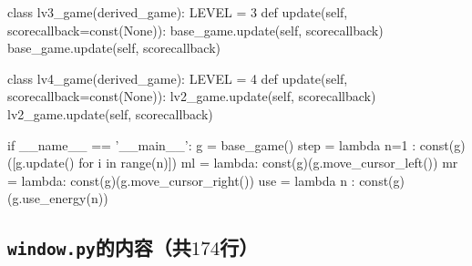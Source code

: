 \documentclass[UTF8]{article}
\begin{document}
\begin{python}
class lv3_game(derived_game):
    LEVEL = 3
    def update(self, scorecallback=const(None)):
        base_game.update(self, scorecallback)
        base_game.update(self, scorecallback)

class lv4_game(derived_game):
    LEVEL = 4
    def update(self, scorecallback=const(None)):
        lv2_game.update(self, scorecallback)
        lv2_game.update(self, scorecallback)

if __name__ == '__main__':
    g = base_game()
    step = lambda n=1 : const(g)([g.update() for i in range(n)])
    ml = lambda: const(g)(g.move_cursor_left())
    mr = lambda: const(g)(g.move_cursor_right())
    use = lambda n : const(g)(g.use_energy(n))

\end{python}

\subsection{\texttt{window.py}的内容（共$174$行）}
\end{document}
